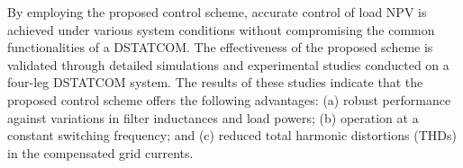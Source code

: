 By employing the proposed control scheme, accurate control of load NPV is achieved under various system conditions without compromising the common functionalities of a DSTATCOM. The effectiveness of the proposed scheme is validated through detailed simulations and experimental studies conducted on a four-leg DSTATCOM system. The results of these studies indicate that the proposed control scheme offers the following advantages: (a) robust performance against variations in filter inductances and load powers; (b) operation at a constant switching frequency; and (c) reduced total harmonic distortions (THDs) in the compensated grid currents.